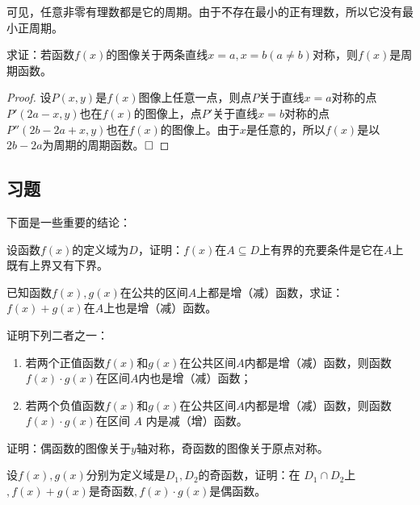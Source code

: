\documentclass[lang=cn,math=cm,chinesefont=nofont,11pt,scheme=chinese,twocol]{elegantbook}
\begin{document}
可见，任意非零有理数都是它的周期。由于不存在最小的正有理数，所以它没有最小正周期。

\begin{example}
  求证：若函数$f(x)$的图像关于两条直线$x=a,x=b(a\neq b)$对称，则$f(x)$是周期函数。
\end{example}

\begin{proof}
  设$P(x,y)$是$f(x)$图像上任意一点，则点$P$关于直线$x=a$对称的点$P'(2a-x,y)$也在$f(x)$的图像上，点$P'$关于直线$x=b$对称的点$P''(2b-2a+x,y)$也在$f(x)$的图像上。由于$x$是任意的，所以$f(x)$是以$2b-2a$为周期的周期函数。$\hfill\square$
\end{proof}

\subsection{习题}

下面是一些重要的结论：

\begin{exercise}
  设函数$f(x)$的定义域为$D$，证明：$f(x)$在$A\subseteq D$上有界的充要条件是它在$A$上既有上界又有下界。
\end{exercise}

\begin{exercise}
  已知函数$f(x),g(x)$在公共的区间$A$上都是增（减）函数，求证：$f(x)+g(x)$在$A$上也是增（减）函数。
\end{exercise}

\begin{exercise}
  证明下列二者之一：
\end{exercise}

\begin{enumerate}
  \item 若两个正值函数$f(x)$和$g(x)$在公共区间$A$内都是增（减）函数，则函数$f(x)\cdot g(x)$在区间$A$内也是增（减）函数；
  \item 若两个负值函数$f(x)$和$g(x)$在公共区间$A$内都是增（减）函数，则函数$f(x)\cdot g(x)$在区间 $A$ 内是减（增）函数。
\end{enumerate}

\begin{exercise}
  证明：偶函数的图像关于$y$轴对称，奇函数的图像关于原点对称。
\end{exercise}

\begin{exercise}
  设$f(x),g(x)$分别为定义域是$D_1,D_2$的奇函数，证明：在 $D_1\cap D_2$上$,f(x)+g(x)$是奇函数$,f(x)\cdot g(x)$是偶函数。
\end{exercise}
\end{document}

